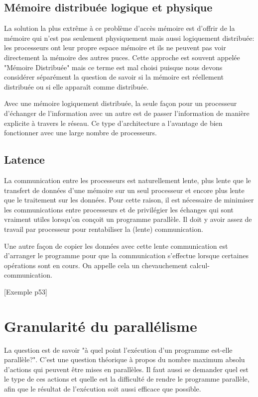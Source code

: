 	\subsection{Mémoire distribuée logique et physique}
	La solution la plus extrême à ce problème d'accès mémoire est d'offrir de la mémoire qui n'est pas seulement physiquement mais aussi logiquement distribuée: les processeurs ont leur propre espace mémoire et ils ne peuvent pas voir directement la mémoire des autres puces. Cette approche est souvent appelée "Mémoire Distribuée" mais ce terme est mal choisi puisque nous devons considérer séparément la question de savoir si la mémoire est réellement distribuée ou si elle apparaît comme distribuée. 
	
	Avec une mémoire logiquement distribuée, la seule façon pour un processeur d'échanger de l'information avec un autre est de passer l'information de manière explicite à travers le réseau. Ce type d'architecture a l'avantage de bien fonctionner avec une large nombre de processeurs.
	
	\subsection{Latence}
	La communication entre les processeurs est naturellement lente, plus lente que le transfert de données d'une mémoire sur un seul processeur et encore plus lente que le traitement sur les données. Pour cette raison, il est nécessaire de minimiser les communications entre processeurs et de privilégier les échanges qui sont vraiment utiles lorsqu'on conçoit un programme parallèle. Il doit y avoir assez de travail par processeur pour rentabiliser la (lente) communication.
	
	Une autre façon de copier les données avec cette lente communication est d'arranger le programme pour que la communication s'effectue lorsque certaines opérations sont en cours. On appelle cela un chevauchement calcul-communication.
	
	
	[Exemple p53]
	
\section{Granularité du parallélisme}
La question est de savoir "à quel point l'exécution d'un programme est-elle parallèle?". C'est une question théorique à propos du nombre maximum absolu d'actions qui peuvent être mises en parallèles. Il faut aussi se demander quel est le type de ces actions et quelle est la difficulté de rendre le programme parallèle, afin que le résultat de l'exécution soit aussi efficace que possible.
	
